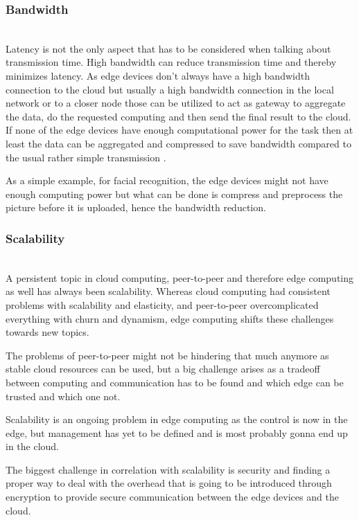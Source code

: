 \subsubsection{Bandwidth}\hspace*{\fill} \\
Latency is not the only aspect that has to be considered when talking about transmission time. High bandwidth can reduce transmission time and thereby minimizes latency.
As edge devices don’t always have a high bandwidth connection to the cloud but usually a high bandwidth connection in the local network or to a closer node those can be utilized to act as gateway to aggregate the data, do the requested computing and then send the final result to the cloud. If none of the edge devices have enough computational power for the task then at least the data can be aggregated and compressed to save bandwidth compared to the usual rather simple transmission \cite{7488250}.

As a simple example, for facial recognition, the edge devices might not have enough computing power but what can be done is compress and preprocess the picture before it is uploaded, hence the bandwidth reduction.

\subsubsection{Scalability}\hspace*{\fill} \\
A persistent topic in cloud computing, peer-to-peer and therefore edge computing as well has always been scalability.
Whereas cloud computing had consistent problems with scalability and elasticity, and peer-to-peer overcomplicated everything with churn and dynamism, edge computing shifts these challenges towards new topics.

The problems of peer-to-peer might not be hindering that much anymore as stable cloud resources can be used, but a big challenge arises as a tradeoff between computing and communication has to be found \cite{7488250}\cite{GarciaLopez:2015:ECV:2831347.2831354} and which edge can be trusted and which one not.

Scalability is an ongoing problem in edge computing as the control is now in the edge, but management has yet to be defined and is most probably gonna end up in the cloud.

The biggest challenge in correlation with scalability is security and finding a proper way to deal with the overhead that is going to be introduced through encryption to provide secure communication between the edge devices and the cloud.

